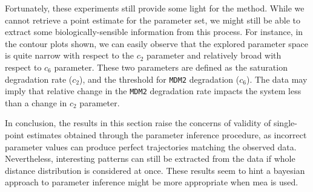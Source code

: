 Fortunately, these experiments still provide some light for the method.
While we cannot retrieve a point estimate for the parameter set, we might still be able to extract some biologically-sensible information from this process. 
For instance, in the contour plots shown, we can easily observe that the explored parameter space is quite narrow with respect to the $c_2$ parameter and relatively broad with respect to $c_6$ parameter. 
These two parameters are defined as the saturation \pft{} degradation rate ($c_2$), and the threshold for \verb"MDM2" degradation ($c_6$)\cite{ale_general_2013}.
The data may imply that relative change in the \verb"MDM2" degradation rate impacts the system less than a change in $c_2$ parameter.

In conclusion, the results in this section raise the concerns of validity of single-point estimates obtained through the parameter inference procedure, as incorrect parameter values can produce perfect trajectories matching the observed data.
Nevertheless, interesting patterns can still be extracted from the data if whole distance distribution is considered at once. 
These results seem to hint a bayesian approach to parameter inference might be more appropriate when \acrlong{mea} is used.

